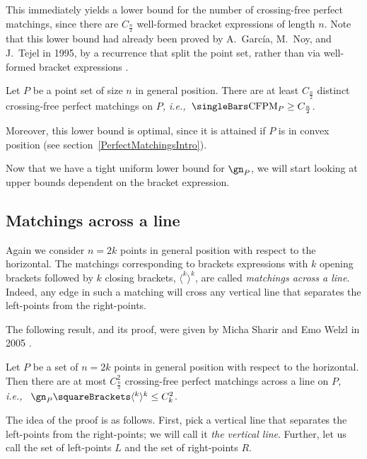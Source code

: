 \documentclass[10pt, a4paper, twoside]{basestyle}
\newcommand{\idest}{\emph{, i.e.,\ }}
\DeclareMathOperator{\CFPM}{CFPM}
\begin{document}
This immediately yields a lower bound for the number of crossing-free perfect matchings, since
there are $C_{\frac n 2}$ well-formed bracket expressions of length $n$.
Note that this lower bound had already been proved by A.~García, M.~Noy, and J.~Tejel in 1995,
by a recurrence that split the point set, rather than via well-formed bracket expressions
\cite{GarciaNoyTejel2000}.
\begin{corollary}
Let $P$ be a point set of size $n$ in general position. There are at least $C_{\frac n 2}$ distinct
crossing-free perfect matchings on $P$\idest $\Cardinality{\CFPM_P} \geq C_{\frac n 2}$.
\end{corollary}
Moreover, this lower bound is optimal, since it is attained if $P$ is in convex position (see
section~\ref{PerfectMatchingsIntro}).

Now that we have a tight uniform lower bound for $\gn_P$, we will start looking at upper bounds
dependent on the bracket expression.
\subsection{Matchings across a line}
Again we consider $n=2k$ points in general position with respect to the horizontal.
The matchings corresponding to brackets expressions with $k$ opening brackets followed
by $k$ closing brackets, $\langle^k\rangle^k$, are called \emph{matchings
across a line}. Indeed, any edge in such a matching will cross any vertical line that separates
the left-points from the right-points.

The following result, and its proof, were given by Micha Sharir and Emo Welzl in 2005 \cite{SharirWelzl2006}.
\NoEndMark
\begin{theorem}
Let $P$ be a set of $n=2k$ points in general position with respect to the horizontal.
Then there are at most $C_{\frac n 2}^2$ crossing-free perfect matchings across a line on $P$\idest
$\gn_P\of {\langle^k\rangle^k} \leq C_k^2$.
\end{theorem}
The idea of the proof is as follows.
First, pick a vertical line that separates the left-points from the right-points;
we will call it \emph{the vertical line}.
Further, let us call the set of left-points $L$ and the set of right-points $R$.
\end{document}
